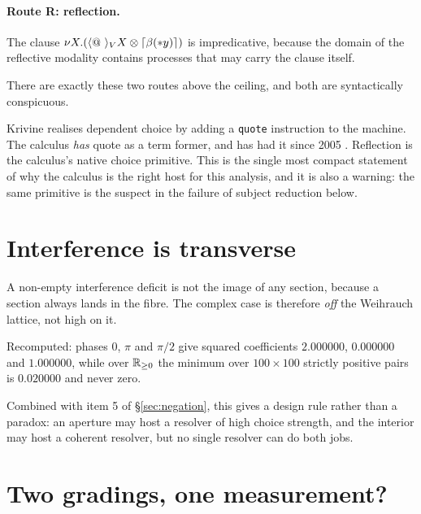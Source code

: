 \paragraph{Route R: reflection.} The clause
$\nu X.(\langle \quot{\ }\rangle_{\V} X \otimes \lceil \beta(\drop{y})\rceil)$ is
impredicative, because the domain of the reflective modality contains processes
that may carry the clause itself.

\begin{corollary}[Trichotomy]
\label{cor:trichotomy}
There are exactly these two routes above the ceiling, and both are syntactically
conspicuous.
\end{corollary}

\begin{remark}
\label{rem:krivine}
Krivine realises dependent choice by adding a \texttt{quote} instruction to the
machine. The \rhoc{} calculus \emph{has} quote as a term former, and has had it
since 2005 \cite{MeredithRadestock05a}. Reflection is the calculus's native choice
primitive. This is the single most compact statement of why the calculus is the
right host for this analysis, and it is also a warning: the same primitive is the
suspect in the failure of subject reduction below.
\end{remark}

\section{Interference is transverse}
\label{sec:transverse}

\begin{proposition}[Transversality]
\label{prop:transverse}
A non-empty interference deficit is not the image of any section, because a
section always lands in the fibre. The complex case is therefore \emph{off} the
Weihrauch lattice, not high on it.
\end{proposition}

Recomputed: phases $0$, $\pi$ and $\pi/2$ give squared coefficients $2.000000$,
$0.000000$ and $1.000000$, while over $\mathbb{R}_{\ge0}$ the minimum over
$100 \times 100$ strictly positive pairs is $0.020000$ and never zero.

Combined with item 5 of \S\ref{sec:negation}, this gives a design rule rather than
a paradox: an aperture may host a resolver of high choice strength, and the
interior may host a coherent resolver, but no single resolver can do both jobs.

\section{Two gradings, one measurement?}
\label{sec:twogradings}

